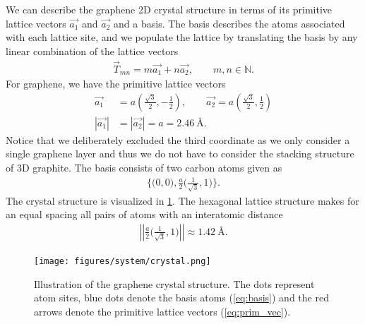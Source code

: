\begin{multicols}{2}
We can describe the graphene 2D crystal structure in terms of its primitive lattice vectors $\vec{a_1}$ and $\vec{a_2}$ and a basis. The basis describes the atoms associated with each lattice site, and we populate the lattice by translating the basis by any linear combination of the lattice vectors 
\begin{align*}
  \vec{T}_{mn} = m\vec{a_1} + n\vec{a_2}, \qquad m,n \in \mathbb{N}.
\end{align*}
For graphene, we have the primitive lattice vectors~\cite{gray2009crystal} 
\begin{align}
  \vec{a_1} &= a \left(\frac{\sqrt{3}}{2}, -\frac{1}{2}\right), \qquad \vec{a_2} = a \left(\frac{\sqrt{3}}{2}, \frac{1}{2}\right) \label{eq:prim_vec} \\
  |\vec{a_1}| &= |\vec{a_2}| = a = 2.46 \ \text{Å}. \nonumber
\end{align}
Notice that we deliberately excluded the third coordinate as we only consider a
single graphene layer and thus we do not have to consider the stacking structure of 3D graphite. The basis consists of two carbon atoms given as 
\begin{align}
  \Big\{\Big(0,0\Big), \frac{a}{2}\Big(\frac{1}{\sqrt{3}}, 1 \Big) \Big\}.
  \label{eq:basis}
\end{align}
The crystal structure is visualized in \cref{fig:graphene_crystal}. The hexagonal lattice structure makes for an equal spacing all pairs of atoms with an interatomic distance
\begin{align*}
  \left|\left|\frac{a}{2}\Big(\frac{1}{\sqrt{3}}, 1 \Big)\right|\right| \approx 1.42 \ \text{Å}.
\end{align*}
  
\begin{figure}[H]
  \centering
  \texttt{[image: figures/system/crystal.png]}
  \caption{Illustration of the graphene crystal structure. The dots represent atom sites, blue dots denote the basis atoms (\cref{eq:basis}) and the red arrows denote the primitive lattice vectors (\cref{eq:prim_vec}). }
  \label{fig:graphene_crystal}
\end{figure}
  
\end{multicols}






